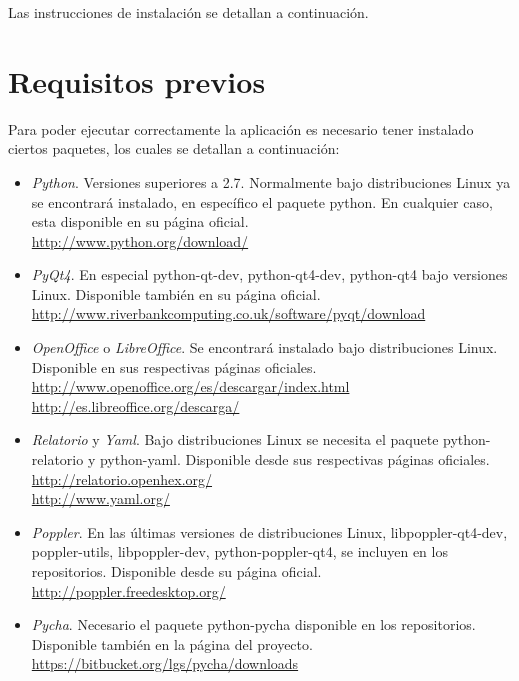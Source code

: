 

Las instrucciones de instalación se detallan a continuación.

\section{Requisitos previos}
Para poder ejecutar correctamente la aplicación es necesario tener instalado ciertos paquetes, los cuales se detallan a continuación:
\begin{itemize}
\item \textit{Python}. Versiones superiores a 2.7. Normalmente bajo distribuciones Linux ya se encontrará instalado, en específico el paquete python. En cualquier caso, esta disponible en su página oficial.\\
\url{http://www.python.org/download/}

\item \textit{PyQt4}. En especial python-qt-dev, python-qt4-dev, python-qt4 bajo versiones Linux. Disponible también en su página oficial.\\
\url{http://www.riverbankcomputing.co.uk/software/pyqt/download}

\item \textit{OpenOffice} o \textit{LibreOffice}. Se encontrará instalado bajo distribuciones Linux. Disponible en sus respectivas páginas oficiales.\\
\url{http://www.openoffice.org/es/descargar/index.html}\\
\url{http://es.libreoffice.org/descarga/}

\item \textit{Relatorio} y \textit{Yaml}. Bajo distribuciones Linux se necesita el paquete python-relatorio y python-yaml. Disponible desde sus respectivas páginas oficiales.\\
\url{http://relatorio.openhex.org/}\\
\url{http://www.yaml.org/}

\item \textit{Poppler}. En las últimas versiones de distribuciones Linux, libpoppler-qt4-dev, poppler-utils, libpoppler-dev, python-poppler-qt4, se incluyen en los repositorios. Disponible desde su página oficial.\\
\url{http://poppler.freedesktop.org/}

\item \textit{Pycha}. Necesario el paquete python-pycha disponible en los repositorios. Disponible también en la página del proyecto.\\
\url{https://bitbucket.org/lgs/pycha/downloads}

\end{itemize}

